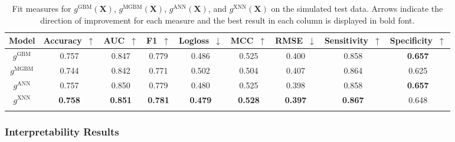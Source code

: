 \documentclass[information,article,accept,moreauthors,pdftex]{Definitions/mdpi}
\begin{document}
\begin{table}[H]%
	\caption{Fit measures for $g^\text{GBM}(\mathbf{X})$, $g^\text{MGBM}(\mathbf{X})$, $g^\text{ANN}(\mathbf{X})$, and $g^\text{XNN}(\mathbf{X})$ on the simulated test data. Arrows indicate the direction of improvement for each measure and the best result in each column is displayed in bold font.}
	\centering
	\begin{tabular}{ccccccccc}
		\toprule
		\textbf{Model} & 
		{\textbf{{Accuracy}}}~$\uparrow$ & 
		{\textbf{{AUC}}}~$\uparrow$ & 
		{\textbf{{F1}}}~$\uparrow$ & 
		{\textbf{{Logloss}}}~$\downarrow$ & 
		{\textbf{{MCC}}}~$\uparrow$ & 
		{\textbf{{RMSE}}}~$\downarrow$ & 
		{\textbf{{Sensitivity}}}~$\uparrow$ & 
		{\textbf{{Specificity}}}~$\uparrow$ \\
		\midrule
		$g^\text{GBM}$		& 0.757 & 0.847 & 0.779 & 0.486 & 0.525 & 0.400 & 0.858 & \textbf{0.657} \\
		$g^\text{MGBM}$		& 0.744 & 0.842 & 0.771 & 0.502 & 0.504 & 0.407 & 0.864 & 0.625 \\
		$g^\text{ANN}$		& 0.757	& 0.850	& 0.779 & 0.480 & 0.525 & 0.398 & 0.858 & \textbf{0.657} \\
		$g^\text{XNN}$		& \textbf{0.758}	& \textbf{0.851}	& \textbf{0.781} & \textbf{0.479} & \textbf{0.528} & \textbf{0.397} & \textbf{0.867} & 0.648 \\
		\bottomrule
		\label{tab:sim_acc}
	\end{tabular}
\end{table}

\subsubsection{Interpretability Results}\label{ssec:xnn_sim}
\end{document}
